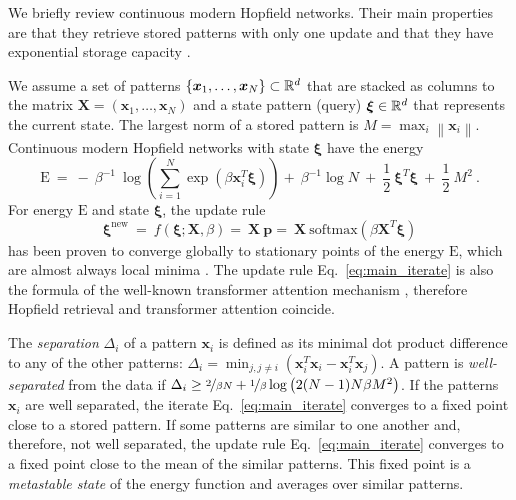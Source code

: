 \documentclass{article}
\theoremstyle{plain}
\theoremstyle{definition}
\theoremstyle{remark}
\newcommand\Bp{\bm{p}}
\newcommand\Bx{\bm{x}}
\newcommand\BX{\bm{X}}
\newcommand\Bxi{\bm{\xi}}
\newcommand{\rE}{\mathrm{E}} \newcommand{\rF}{\mathrm{F}}
\newcommand\nn{\mathrm{new}}
\newcommand{\NRM}[1]{{{\left\| #1\right\|}}}
\newcommand{\soft}{\mathrm{softmax}}
\begin{document}
We briefly review  
continuous modern Hopfield networks.
Their main properties are that they retrieve 
stored patterns with only one update 
and that they have exponential storage capacity
\citep{Ramsauer:21}.

We assume a set of patterns $\{\Bx_1,\ldots,\Bx_N\} \subset \dR^d$
that are stacked as columns to 
the matrix $\BX = \left( \Bx_1,\ldots,\Bx_N \right)$ and a 
state pattern (query) $\Bxi \in \dR^d$ that represents the current state. 
The largest norm of a stored pattern is
$M = \max_{i} \NRM{\Bx_i}$.
Continuous modern Hopfield networks with state $\Bxi$
have the energy
\begin{equation}
\label{eq:energy}
\rE  \ =   \ -  \ \beta^{-1} \ \log \left( \sum_{i=1}^N
\exp(\beta \Bx_i^T \Bxi) \right) +  \ \beta^{-1} \log N  \ + \
\frac{1}{2} \ \Bxi^T \Bxi  \ +  \ \frac{1}{2} \ M^2 \ .
\end{equation}
For energy $\rE$ and state $\Bxi$, the update rule 
\begin{equation}
\label{eq:main_iterate}
\Bxi^{\nn} \ = \ f(\Bxi;\BX,\beta) = \ \BX \ \Bp = \   \BX \ \soft ( \beta \BX^T \Bxi)
\end{equation}
has been proven to converge globally  
to stationary points of the energy $\rE$, which are almost always local minima 
\citep{Ramsauer:21}.
The update rule Eq.~\eqref{eq:main_iterate}
is also the formula of the well-known transformer attention mechanism
\citep{Vaswani:17,Ramsauer:21}, therefore Hopfield retrieval and
transformer attention coincide.

The {\em separation} $\Delta_i$  of a 
pattern $\Bx_i$ is defined as its minimal dot product difference to any of the other 
patterns:
$\Delta_i = \min_{j,j \not= i} \left( \Bx_i^T \Bx_i - \Bx_i^T \Bx_j \right)$. 
A pattern is {\em well-separated} from the data if $
 \Delta_i  \geq \nicefrac{2}{\beta N} + \nicefrac{1}{\beta} \log \left( 2 (N-1)  N  \beta  M^2 \right)$.
If the patterns $\Bx_i$ are well separated, the iterate Eq.~\eqref{eq:main_iterate}
converges to a fixed point close to a stored pattern.
If some patterns are similar to one another and, therefore, not well separated, 
the update rule Eq.~\eqref{eq:main_iterate} converges to 
a fixed point close to the mean of the similar patterns. 
This fixed point is a {\em metastable state} of the energy function
and averages over similar patterns.
\end{document}
